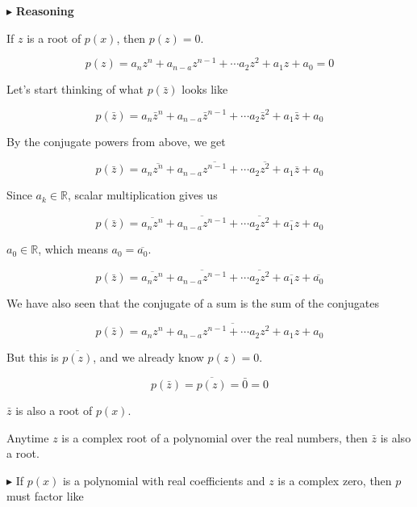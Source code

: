 \documentclass{ximera}
\begin{document}
$\blacktriangleright$ \textbf{Reasoning}




If $z$ is a root of $p(x)$, then $p(z) = 0$.


\[    p(z) = a_n z^n + a_{n-a} z^{n-1} + \cdots a_2 z^2 + a_1 z + a_0  = 0   \]


Let's start thinking of what $p(\bar{z})$ looks like



\[    p(\bar{z}) = a_n \bar{z}^n + a_{n-a} \bar{z}^{n-1} + \cdots a_2 \bar{z}^2 + a_1 \bar{z} + a_0    \]


By the conjugate powers from above, we get 


\[    p(\bar{z}) = a_n \overline{z^n} + a_{n-a} \overline{z^{n-1}} + \cdots a_2 \overline{z^2} + a_1 \overline{z} + a_0    \]



Since $a_k \in \mathbb{R}$, scalar multiplication gives us




\[    p(\bar{z}) = \overline{a_n z^n} +  \overline{a_{n-a} z^{n-1}} + \cdots  \overline{a_2 z^2} +  \overline{a_1 z} + a_0    \]



$a_0 \in \mathbb{R}$, which means $a_0 = \overline{a_0}$.



\[    p(\bar{z}) = \overline{a_n z^n} +  \overline{a_{n-a} z^{n-1}} + \cdots  \overline{a_2 z^2} +  \overline{a_1 z} + \overline{a_0}    \]





We have also seen that the conjugate of a sum is the sum of the conjugates


\[    p(\bar{z}) = \overline{a_n z^n + a_{n-a} z^{n-1} + \cdots  a_2 z^2 +  a_1 z + a_0}   \]



But this is $\overline{p(z)}$, and we already know  $p(z) = 0$.



\[    p(\bar{z}) = \overline{p(z)} = \bar{0} = 0  \]


$\bar{z}$ is also a root of $p(x)$. 





Anytime $z$ is a complex root of a polynomial over the real numbers, then $\bar{z}$ is also a root. 





\textbf{\textcolor{red!70!darkgray}{$\blacktriangleright$}}   If $p(x)$ is a polynomial with real coefficients and $z$ is a complex zero, then $p$ must factor like
\end{document}
